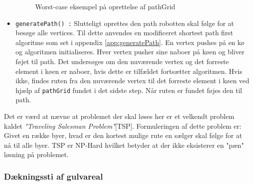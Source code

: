 \begin{itemize}
\begin{figure}[h!]
	\label{fig:pathGrid}
	\caption{Worst-case eksempel på oprettelse af pathGrid}
\end{figure}
	 \item \texttt{generatePath() :} Slutteligt oprettes den path robotten skal følge for at besøge alle vertices. Til dette anvendes en modificeret shortest path first algoritme som set i appendix \ref{app:generatePath}. En vertex pushes på en kø og algoritmen initialiseres. Hver vertex pusher sine naboer på køen og bliver føjet til path. Det undersøges om den nuværende vertex og det forreste element i køen er naboer, hvis dette er tilfældet fortsætter algoritmen. Hvis ikke, findes ruten fra den nuværende vertex til det forreste element i køen ved hjælp af \texttt{pathGrid} fundet i det sidste step. Når ruten er fundet føjes den til path. 
\end{itemize}
Det er værd at nævne at problemet der skal løses her er et velkendt problem kaldet \textit{"Traveling Salesman Problem"}[TSP]. Formuleringen af dette problem er: Givet en række byer, hvad er den kortest mulige rute en sælger skal følge for at nå til alle byer. TSP er NP-Hard hvilket betyder at der ikke eksisterer en "pæn" løsning på problemet. 

\subsubsection{Dækningssti af gulvareal}